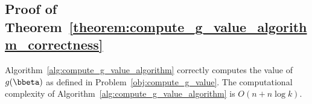 \subsection{Proof of Theorem~\ref{theorem:compute_g_value_algorithm_correctness}}
\label{appendix_subsec:compute_g_value_algorithm_correctness}

\begin{namedtheorem}[~\ref{theorem:compute_g_value_algorithm_correctness}]
    \label{appendix_theorem:compute_g_value_algorithm_correctness}
    Algorithm~\ref{alg:compute_g_value_algorithm} correctly computes the value of $g(\bbeta)$ as defined in Problem~\eqref{obj:compute_g_value}.
    The computational complexity of Algorithm~\ref{alg:compute_g_value_algorithm} is $O(n + n \log k)$.
\end{namedtheorem}

